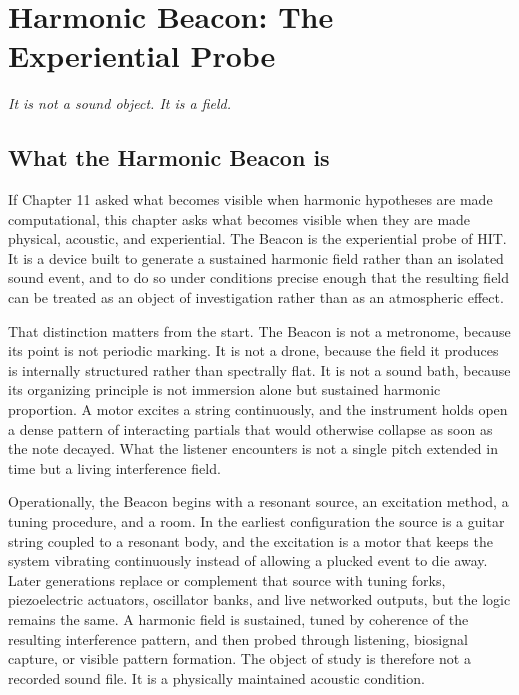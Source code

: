 \chapter{Harmonic Beacon: The Experiential Probe}

\epigraph{\emph{It is not a sound object. It is a field.}}{}



\section{What the Harmonic Beacon is}


If Chapter 11 asked what becomes visible when harmonic hypotheses are made computational, this chapter asks what becomes visible when they are made physical, acoustic, and experiential. The Beacon is the experiential probe of HIT. It is a device built to generate a sustained harmonic field rather than an isolated sound event, and to do so under conditions precise enough that the resulting field can be treated as an object of investigation rather than as an atmospheric effect.

That distinction matters from the start. The Beacon is not a metronome, because its point is not periodic marking. It is not a drone, because the field it produces is internally structured rather than spectrally flat. It is not a sound bath, because its organizing principle is not immersion alone but sustained harmonic proportion. A motor excites a string continuously, and the instrument holds open a dense pattern of interacting partials that would otherwise collapse as soon as the note decayed. What the listener encounters is not a single pitch extended in time but a living interference field.

Operationally, the Beacon begins with a resonant source, an excitation method, a tuning procedure, and a room. In the earliest configuration the source is a guitar string coupled to a resonant body, and the excitation is a motor that keeps the system vibrating continuously instead of allowing a plucked event to die away. Later generations replace or complement that source with tuning forks, piezoelectric actuators, oscillator banks, and live networked outputs, but the logic remains the same. A harmonic field is sustained, tuned by coherence of the resulting interference pattern, and then probed through listening, biosignal capture, or visible pattern formation. The object of study is therefore not a recorded sound file. It is a physically maintained acoustic condition.

